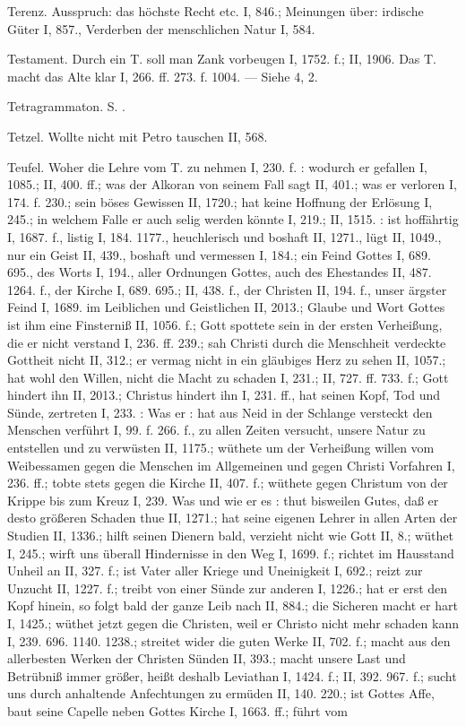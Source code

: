 Terenz. Ausspruch: das höchste Recht etc. I, 846.; Meinungen über: irdische Güter I, 857., Verderben der menschlichen Natur I, 584.

Testament. Durch ein T. soll man Zank vorbeugen I, 1752. f.; II, 1906. Das  T. macht das Alte klar I, 266. ff. 273. f. 1004. — Siehe  4,  2.

Tetragrammaton. S. .

Tetzel. Wollte nicht mit Petro tauschen II, 568.

Teufel. Woher die Lehre vom T. zu nehmen I, 230. f. : wodurch er gefallen I, 1085.; II, 400. ff.; was der Alkoran von seinem Fall sagt II, 401.; was er verloren I, 174. f. 230.; sein böses Gewissen II, 1720.; hat keine Hoffnung der Erlösung I, 245.; in welchem Falle er auch selig werden könnte I, 219.; II, 1515. : ist hoffährtig I, 1687. f., listig I, 184. 1177., heuchlerisch und boshaft II, 1271., lügt II, 1049., nur ein Geist II, 439., boshaft und vermessen I, 184.; ein Feind Gottes I, 689. 695., des Worts I, 194., aller Ordnungen Gottes, auch des Ehestandes II, 487. 1264. f., der Kirche I, 689. 695.; II, 438. f., der Christen II, 194. f., unser ärgster Feind I, 1689. im Leiblichen und Geistlichen II, 2013.; Glaube und Wort Gottes ist ihm eine Finsterniß II, 1056. f.; Gott spottete sein in der ersten Verheißung, die er nicht verstand I, 236. ff. 239.; sah Christi durch die Menschheit verdeckte Gottheit nicht II, 312.; er vermag nicht in ein gläubiges Herz zu sehen II, 1057.; hat wohl den Willen, nicht die Macht zu schaden I, 231.; II, 727. ff. 733. f.; Gott hindert ihn II, 2013.; Christus hindert ihn I, 231. ff., hat seinen Kopf, Tod und Sünde, zertreten I, 233. : Was er : hat aus Neid in der Schlange versteckt den Menschen verführt I, 99. f. 266. f., zu allen Zeiten versucht, unsere Natur zu entstellen und zu verwüsten II, 1175.; wüthete um der Verheißung willen vom Weibessamen gegen die Menschen im Allgemeinen und gegen Christi Vorfahren I, 236. ff.; tobte stets gegen die Kirche II, 407. f.; wüthete gegen Christum von der Krippe bis zum Kreuz I, 239. Was und wie er es : thut bisweilen Gutes, daß er desto größeren Schaden thue II, 1271.; hat seine eigenen Lehrer in allen Arten der Studien II, 1336.; hilft seinen Dienern bald, verzieht nicht wie Gott II, 8.; wüthet I, 245.; wirft uns überall Hindernisse in den Weg I, 1699. f.; richtet im Hausstand Unheil an II, 327. f.; ist Vater aller Kriege und Uneinigkeit I, 692.; reizt zur Unzucht II, 1227. f.; treibt von einer Sünde zur anderen I, 1226.; hat er erst den Kopf hinein, so folgt bald der ganze Leib nach II, 884.; die Sicheren macht er hart I, 1425.; wüthet jetzt gegen die Christen, weil er Christo nicht mehr schaden kann I, 239. 696. 1140. 1238.; streitet wider die guten Werke II, 702. f.; macht aus den allerbesten Werken der Christen Sünden II, 393.; macht unsere Last und Betrübniß immer größer, heißt deshalb Leviathan I, 1424. f.; II, 392. 967. f.; sucht uns durch anhaltende Anfechtungen zu ermüden II, 140. 220.; ist Gottes Affe, baut seine Capelle neben Gottes Kirche I, 1663. ff.; führt vom 